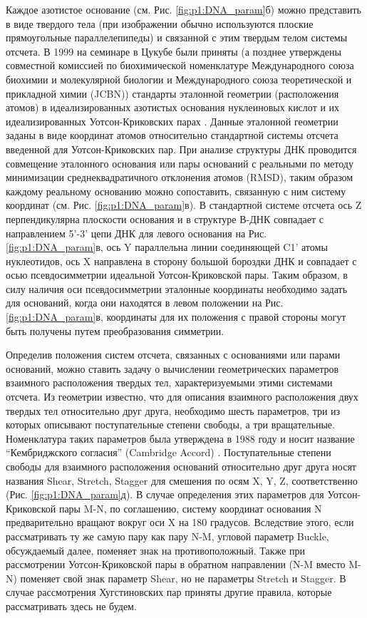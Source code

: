 Каждое азотистое основание (см. Рис. \ref{fig:p1:DNA_param}б) можно представить в виде твердого тела (при изображении обычно используются плоские прямоугольные параллелепипеды) и связанной с этим твердым телом системы отсчета. В 1999 на семинаре в Цукубе были приняты (а позднее утверждены совместной комиссией по биохимической номенклатуре Международного союза биохимии и молекулярной биологии и Международного союза теоретической и прикладной химии  (JCBN)) стандарты эталонной геометрии (расположения атомов) в идеализированных азотистых основания нуклеиновых кислот и их идеализированных Уотсон-Криковских парах \cite{olson_standard_2001}. Данные эталонной геометрии заданы в виде координат атомов относительно стандартной системы отсчета введенной для Уотсон-Криковских пар. При анализе структуры ДНК проводится совмещение эталонного основания или пары оснований с реальными по методу минимизации среднеквадратичного отклонения атомов (RMSD), таким образом каждому реальному основанию можно сопоставить, связанную с ним систему координат (см. Рис. \ref{fig:p1:DNA_param}в). В стандартной системе отсчета ось Z перпендикулярна плоскости основания и в структуре В-ДНК совпадает с направлением 5'-3' цепи ДНК для левого основания на Рис. \ref{fig:p1:DNA_param}в, ось Y параллельна линии соединяющей C1' атомы нуклеотидов, ось X направлена в сторону большой бороздки ДНК и совпадает с осью псевдосимметрии идеальной Уотсон-Криковской пары. Таким образом, в силу наличия оси псевдосимметрии эталонные координаты необходимо задать для оснований, когда они находятся в левом положении на Рис. \ref{fig:p1:DNA_param}в, координаты для их положения с правой стороны могут быть получены путем преобразования симметрии.

Определив положения систем отсчета, связанных с основаниями или парами оснований, можно ставить задачу о вычислении геометрических параметров взаимного расположения твердых тел, характеризуемыми этими системами отсчета. Из геометрии известно, что для описания взаимного расположения двух твердых тел относительно друг друга, необходимо шесть параметров, три из которых описывают поступательные степени свободы, а три вращательные. Номенклатура таких параметров была утверждена в 1988 году и носит название ``Кембриджского согласия'' (Cambridge Accord) \cite{dickerson_definitions_1989}.
Поступательные степени свободы для взаимного расположения оснований относительно друг друга носят названия Shear, Stretch, Stagger для смешения по осям X, Y, Z, соответственно (Рис. \ref{fig:p1:DNA_param}д). В случае определения этих параметров для Уотсон-Криковской пары M-N, по соглашению, систему координат основания N предварительно вращают вокруг оси X на 180 градусов. Вследствие этого, если рассматривать ту же самую пару как пару N-M, угловой параметр Buckle, обсуждаемый далее, поменяет знак на противоположный. Также при рассмотрении Уотсон-Криковской пары в обратном направлении (N-M вместо M-N) поменяет свой знак параметр Shear, но не параметры Stretch и Stagger. В случае рассмотрения Хугстиновских пар приняты другие правила, которые рассматривать здесь не будем.

